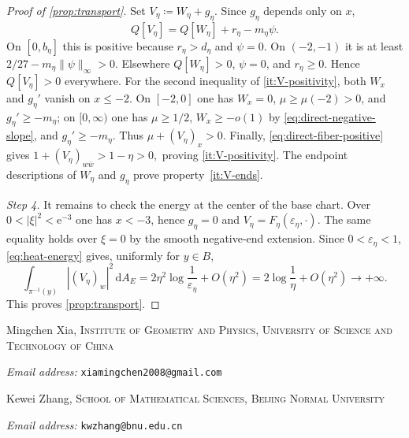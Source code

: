 \documentclass[11pt,a4paper]{article}
\begin{document}
\begin{proof}[Proof of \cref{prop:transport}]
		Set $V_\eta\coloneqq W_\eta+g_\eta$.  Since $g_\eta$ depends only
		on $x$,
		\[
			Q[V_\eta]=Q[W_\eta]+r_\eta-m_\eta\psi.
		\]
		On $[0,b_\eta]$ this is positive because $r_\eta>d_\eta$ and
		$\psi=0$.  On $(-2,-1)$ it is at least
		$2/27-m_\eta\|\psi\|_\infty>0$.  Elsewhere $Q[W_\eta]>0$,
		$\psi=0$, and $r_\eta\ge0$.  Hence $Q[V_\eta]>0$ everywhere.
		For the second inequality of \ref{it:V-positivity}, both $W_x$ and $g_\eta'$ vanish on $x\le-2$.
		On $[-2,0]$ one has $W_x=0$, $\mu\ge\mu(-2)>0$, and
		$g_\eta'\ge-m_\eta$; on $[0,\infty)$ one has $\mu\ge1/2$,
		$W_x\ge-o(1)$ by
		\eqref{eq:direct-negative-slope}, and $g_\eta'\ge-m_\eta$.
		Thus $\mu+(V_\eta)_x>0$.  Finally,
		\eqref{eq:direct-fiber-positive} gives
		\(
			1+(V_\eta)_{w\bar w}>1-\eta>0,
		\)
        proving \ref{it:V-positivity}.
		The endpoint descriptions of $W_\eta$ and $g_\eta$ prove
		property~\ref{it:V-ends}.

		\emph{Step 4.}
		It remains to check the energy at the center of the base chart.
		Over $0<|\xi|^2<\mathrm{e}^{-3}$ one has $x<-3$, hence
		$g_\eta=0$ and
		$V_\eta=F_\eta(\varepsilon_\eta,\cdot)$.  The same equality holds
		over $\xi=0$ by the smooth negative-end extension.  Since
		$0<\varepsilon_\eta<1$, \eqref{eq:heat-energy} gives, uniformly
		for $y\in B$,
		\[
			\int_{\pi^{-1}(y)}|(V_\eta)_w|^2\,\mathrm{d}A_E
			=2\eta^2\log\frac1{\varepsilon_\eta}+O(\eta^2)
			=2\log\frac1\eta+O(\eta^2)
			\longrightarrow+\infty.
		\]
		This proves \cref{prop:transport}.
	\end{proof}
	\printbibliography

	Mingchen Xia, \textsc{Institute of Geometry and Physics, University of Science and Technology of China}\par\nopagebreak
	\textit{Email address:} \texttt{xiamingchen2008@gmail.com}

	Kewei Zhang, \textsc{School of Mathematical Sciences, Beijing Normal University}\par\nopagebreak
	\textit{Email address:} \texttt{kwzhang@bnu.edu.cn}
\end{document}
